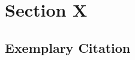 \clearpage
\section{Section X}
\label{sec:Section_Name_X}

\subsection{Exemplary Citation}
\label{subsec:Section_Name_X/cite}
